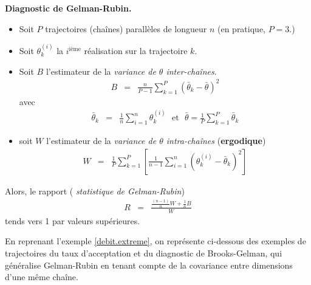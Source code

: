 \begin{definition}{\bf Diagnostic de Gelman-Rubin.}
\begin{itemize}
\item Soit $P$ trajectoires (chaînes) parallèles de longueur $n$ (en pratique, $P = 3$.)
\item Soit $\theta^{(i)}_k$ la $i^{\text{ième}}$ réalisation sur la trajectoire $k$.
\item Soit $B$ l'estimateur de la \emph{variance de $\theta$ inter-chaînes}. 
\begin{eqnarray*}
B & = & \frac{n}{P-1}\sum\limits_{k=1}^P \left(\bar{\theta}_k - \bar{\theta}\right)^2
\end{eqnarray*}
avec
\begin{eqnarray*}
\bar{\theta}_k & = & \frac{1}{n}\sum\limits_{i=1}^n \theta^{(i)}_k \ \ \ \text{et} \ \ \ \bar{\theta} = \frac{1}{P} \sum\limits_{k=1}^P \bar{\theta}_k 
\end{eqnarray*}
\item soit $W$ l'estimateur de la \emph{variance de $\theta$ intra-chaînes} ({\bf ergodique})
\begin{eqnarray*}
W & = & \frac{1}{P}\sum\limits_{k=1}^P \left[\frac{1}{n-1}\sum\limits_{i=1}^n  \left({\theta}^{(i)}_k - \bar{\theta}_k\right)^2\right]
\end{eqnarray*}
\end{itemize}
Alors, { le rapport} (\emph{ statistique de Gelman-Rubin})
\begin{eqnarray*}
R & = & \frac{\frac{(n-1)}{n}W + \frac{1}{n}B}{W}
\end{eqnarray*}
{ tends vers 1 par valeurs supérieures}.
\end{definition}

En reprenant l'exemple \ref{debit.extreme}, on représente ci-dessous des exemples de trajectoires du taux d'acceptation et du  diagnostic de Brooks-Gelman, qui généralise Gelman-Rubin en tenant compte de la covariance entre dimensions d'une même chaîne. \\

